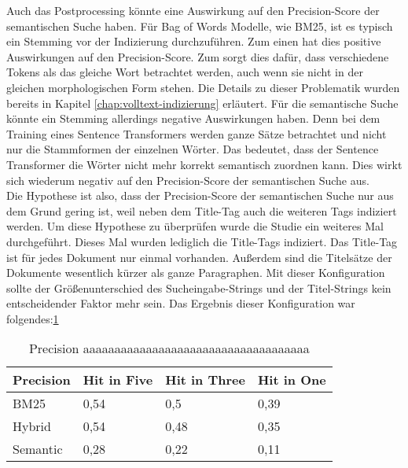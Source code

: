 Auch das Postprocessing könnte eine Auswirkung auf den Precision-Score der semantischen Suche haben.
Für Bag of Words Modelle, wie BM25, ist es typisch ein Stemming vor der Indizierung durchzuführen.
Zum einen hat dies positive Auswirkungen auf den Precision-Score.
Zum sorgt dies dafür, dass verschiedene Tokens als das gleiche Wort betrachtet werden, auch wenn sie nicht in der gleichen morphologischen Form stehen.
Die Details zu dieser Problematik wurden bereits in Kapitel \ref{chap:volltext-indizierung} erläutert.
Für die semantische Suche könnte ein Stemming allerdings negative Auswirkungen haben.
Denn bei dem Training eines Sentence Transformers werden ganze Sätze betrachtet und nicht nur die Stammformen der einzelnen Wörter.
Das bedeutet, dass der Sentence Transformer die Wörter nicht mehr korrekt semantisch zuordnen kann.
Dies wirkt sich wiederum negativ auf den Precision-Score der semantischen Suche aus.\\

Die Hypothese ist also, dass der Precision-Score der semantischen Suche nur aus dem Grund gering ist, weil neben dem Title-Tag auch die weiteren Tags indiziert werden.
Um diese Hypothese zu überprüfen wurde die Studie ein weiteres Mal durchgeführt.
Dieses Mal wurden lediglich die Title-Tags indiziert.
Das Title-Tag ist für jedes Dokument nur einmal vorhanden.
Außerdem sind die Titelsätze der Dokumente wesentlich kürzer als ganze Paragraphen.
Mit dieser Konfiguration sollte der Größenunterschied des Sucheingabe-Strings und der Titel-Strings kein entscheidender Faktor mehr sein.
Das Ergebnis dieser Konfiguration war folgendes:\ref{precision-tabelle}

\begin{table}[!ht]
    \centering
    \label{precision-tabelle}
    \begin{tabular}{|l|l|l|l|}
        \hline
        Precision & Hit in Five & Hit in Three & Hit in One \\ \hline
        BM25 & 0,54 & 0,5 & 0,39 \\ \hline
        Hybrid & 0,54 & 0,48 & 0,35 \\ \hline
        Semantic & 0,28 & 0,22 & 0,11 \\ \hline
    \end{tabular}
    \caption[Precision]{Precision aaaaaaaaaaaaaaaaaaaaaaaaaaaaaaaaaaaa}
\end{table}

